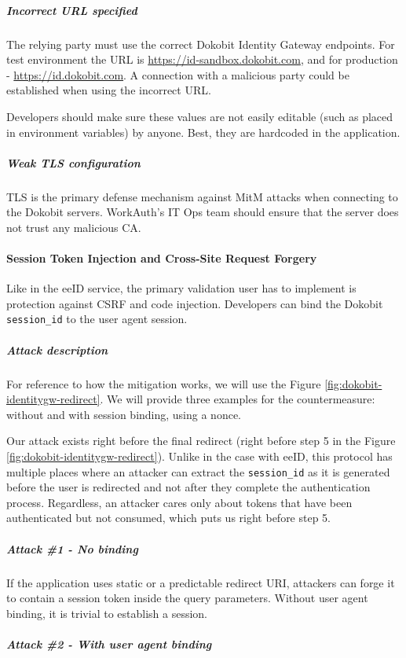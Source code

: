 \subparagraph{Incorrect URL specified}

The relying party must use the correct Dokobit Identity Gateway endpoints. For test environment the URL is \url{https://id-sandbox.dokobit.com}, and for production - \url{https://id.dokobit.com}. A connection with a malicious party could be established when using the incorrect URL.

Developers should make sure these values are not easily editable (such as placed in environment variables) by anyone. Best, they are hardcoded in the application.

\subparagraph{Weak TLS configuration}

TLS is the primary defense mechanism against MitM attacks when connecting to the Dokobit servers. WorkAuth's IT Ops team should ensure that the server does not trust any malicious CA.

\paragraph{Session Token Injection and Cross-Site Request Forgery}

Like in the eeID service, the primary validation user has to implement is protection against CSRF and code injection. Developers can bind the Dokobit \texttt{session\_id} to the user agent session.

\subparagraph{Attack description}

For reference to how the mitigation works, we will use the Figure \ref{fig:dokobit-identitygw-redirect}. We will provide three examples for the countermeasure: without and with session binding, using a nonce.

Our attack exists right before the final redirect (right before step 5 in the Figure \ref{fig:dokobit-identitygw-redirect}). Unlike in the case with eeID, this protocol has multiple places where an attacker can extract the \texttt{session\_id} as it is generated before the user is redirected and not after they complete the authentication process. Regardless, an attacker cares only about tokens that have been authenticated but not consumed, which puts us right before step 5.

\subparagraph{Attack \#1 - No binding}

If the application uses static or a predictable redirect URI, attackers can forge it to contain a session token inside the query parameters. Without user agent binding, it is trivial to establish a session.

\subparagraph{Attack \#2 - With user agent binding}

